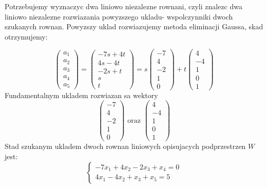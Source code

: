 \documentclass{article}
\begin{document}
Potrzebujemy wyznaczyc dwa liniowo niezalezne rownani, czyli znalezc dwa liniowo niezalezne rozwiazania powyzszego ukladu- wspolczynniki dwoch szukanych rownan. Powyzszy uklad rozwiazujemy metoda eliminacji Gaussa, skad otrzymujemy:

$$
\begin{pmatrix} a_{1} \\ a_{2} \\ a_{3} \\ a_{4} \\ a_{5} \end{pmatrix} = 
\begin{pmatrix} -7s + 4t \\ 4s - 4t \\ -2s + t \\ s \\ t \end{pmatrix} =
s \begin{pmatrix} -7 \\ 4 \\ -2 \\ 1 \\ 0 \end{pmatrix} +
t \begin{pmatrix} 4 \\ -4 \\ 1 \\ 0 \\ 1 \end{pmatrix}
$$
Fundamentalnym ukladem rozwiazan sa wektory $$\begin{pmatrix} -7 \\ 4 \\ -2 \\ 1 \\ 0 \end{pmatrix} \text{ oraz } \begin{pmatrix} 4 \\ -4 \\ 1 \\ 0 \\ 1 \end{pmatrix}$$ Stad szukanym ukladem dwoch rownan liniowych opisujacych podprzestrzen $W$ jest:
$$
\begin{cases}
-7x_{1} + 4x_{2} - 2x_{3} + x_{4} = 0 \\
4x_{1} - 4x_{2} + x_{3} + x_{5} = 5
\end{cases}
$$
\end{document}
